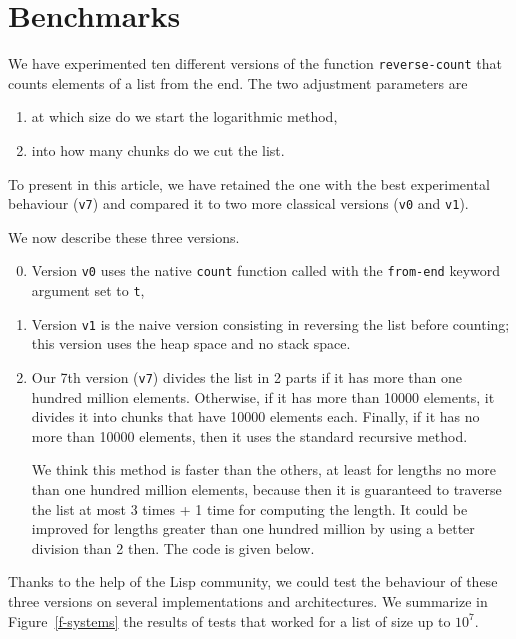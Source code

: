 \section{Benchmarks}
\label{sec-benchmarks}

We have experimented ten different versions of the function \texttt{reverse-count}
that counts elements of a list from the end. The two adjustment parameters are
\begin{enumerate}
\item at which size do we start the logarithmic method,
\item into how many chunks do we cut the list.
\end{enumerate}

To present in this article, 
we have retained the one with the best experimental behaviour (\texttt{v7})
and compared it to two more classical versions  (\texttt{v0} and \texttt{v1}).

We now describe these three versions.

\begin{enumerate}
\setcounter{enumi}{-1}
\item Version \texttt{v0} uses the native \texttt{count} function called with the \texttt{from-end} keyword argument set to \texttt{t},
\item Version \texttt{v1} is the naive version consisting in reversing the list 
before counting; this version uses the heap space and no stack space.
\setcounter{enumi}{6}
\item Our 7th version (\texttt{v7}) divides the list in 2 parts 
if it has more than one 
hundred million elements.  Otherwise, if it has more than 10000
elements, it divides it into chunks that have 10000 elements each.
Finally, if it has no more than 10000 elements, then it uses the
standard recursive method.

We think this method is faster than the others, at least for
lengths no more than one hundred million elements, because then it
is guaranteed to traverse the list at most 3 times + 1 time for
computing the length.  It could be improved for lengths greater
than one hundred million by using a better division than 2 then.
The code is given below.
\end{enumerate}


Thanks to the help of the Lisp community, we could test the behaviour
of these three versions on several implementations and architectures.
We summarize in Figure~\ref{f-systems} the results of tests that 
worked for a list of size up to $10^7$.

